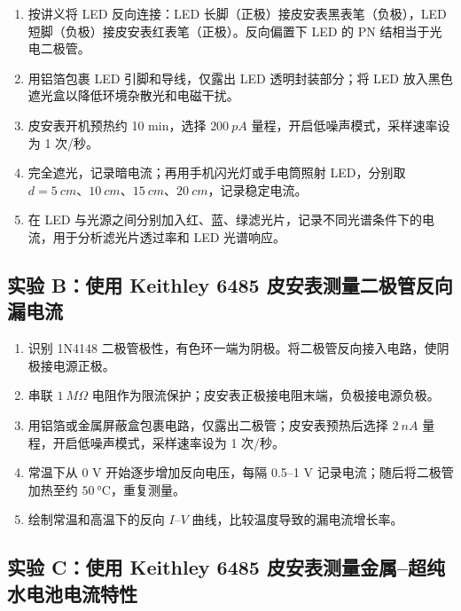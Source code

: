 \documentclass[11pt]{article}
\begin{document}
\begin{enumerate}
    \item 按讲义将 LED 反向连接：LED 长脚（正极）接皮安表黑表笔（负极），LED 短脚（负极）接皮安表红表笔（正极）。反向偏置下 LED 的 PN 结相当于光电二极管。
    \item 用铝箔包裹 LED 引脚和导线，仅露出 LED 透明封装部分；将 LED 放入黑色遮光盒以降低环境杂散光和电磁干扰。
    \item 皮安表开机预热约 10 min，选择 $\SI{200}{pA}$ 量程，开启低噪声模式，采样速率设为 1 次/秒。
    \item 完全遮光，记录暗电流；再用手机闪光灯或手电筒照射 LED，分别取 $d=\SI{5}{cm}$、$\SI{10}{cm}$、$\SI{15}{cm}$、$\SI{20}{cm}$，记录稳定电流。
    \item 在 LED 与光源之间分别加入红、蓝、绿滤光片，记录不同光谱条件下的电流，用于分析滤光片透过率和 LED 光谱响应。
\end{enumerate}

\subsection{实验 B：使用 Keithley 6485 皮安表测量二极管反向漏电流}

\begin{enumerate}
    \item 识别 1N4148 二极管极性，有色环一端为阴极。将二极管反向接入电路，使阴极接电源正极。
    \item 串联 $\SI{1}{M\Omega}$ 电阻作为限流保护；皮安表正极接电阻末端，负极接电源负极。
    \item 用铝箔或金属屏蔽盒包裹电路，仅露出二极管；皮安表预热后选择 $\SI{2}{nA}$ 量程，开启低噪声模式，采样速率设为 1 次/秒。
    \item 常温下从 0 V 开始逐步增加反向电压，每隔 0.5--1 V 记录电流；随后将二极管加热至约 $\SI{50}{\degreeCelsius}$，重复测量。
    \item 绘制常温和高温下的反向 $I$--$V$ 曲线，比较温度导致的漏电流增长率。
\end{enumerate}

\subsection{实验 C：使用 Keithley 6485 皮安表测量金属--超纯水电池电流特性}
\end{document}
